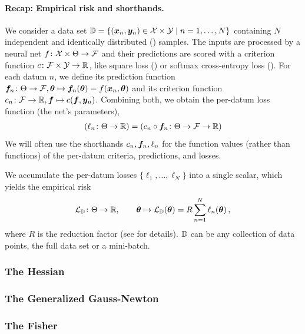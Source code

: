 \paragraph{Recap: Empirical risk and shorthands.}
We consider a data set ${\mathbb{D}} = \{({\bm{x}}_n, {\bm{y}}_n) \in {\mathcal{X}} \times {\mathcal{Y}} \mid n = 1, \dots, N \}$ containing $N$ independent and identically distributed (\iid) samples.
The inputs are processed by a neural net $f\colon {\mathcal{X}} \times \Theta \to {\mathcal{F}}$ and their predictions are scored with a criterion function $c\colon {\mathcal{F}} \times {\mathcal{Y}} \to {\mathbb{R}}$, like square loss () or softmax cross-entropy loss ().
For each datum $n$, we define its prediction function ${\bm{f}}_n\colon \Theta \to {\mathcal{F}}, {\bm{\theta}} \mapsto {\bm{f}}_n({\bm{\theta}}) = f({\bm{x}}_n, {\bm{\theta}})$ and its criterion function $c_n\colon {\mathcal{F}} \to {\mathbb{R}}, {\bm{f}} \mapsto c({\bm{f}}, {\bm{y}}_n)$.
Combining both, we obtain the per-datum loss function (\wrt the net's parameters),
\begin{align*}
  (\ell_n\colon \Theta \to {\mathbb{R}}) = (c_n \circ {\bm{f}}_n\colon \Theta \to {\mathcal{F}} \to {\mathbb{R}})
\end{align*}
We will often use the shorthands $c_n, {\bm{f}}_n, \ell_n$ for the function values (rather than functions) of the per-datum criteria, predictions, and losses.

We accumulate the per-datum losses $\{\ell_1, \dots, \ell_N\}$ into a single scalar, which yields the empirical risk
\begin{align*}
  {\mathcal{L}}_{{\mathbb{D}}}\colon \Theta \to {\mathbb{R}},
  \qquad
  {\bm{\theta}} \mapsto {\mathcal{L}}_{{\mathbb{D}}}({\bm{\theta}}) = R \sum_{n=1}^N \ell_n({\bm{\theta}})\,,
\end{align*}
where $R$ is the reduction factor (see  for details).
${\mathbb{D}}$ can be any collection of data points, \eg the full data set or a mini-batch.

\subsubsection{The Hessian}\label{sec:basics_dl_hessian}


\subsubsection{The Generalized Gauss-Newton}\label{subsec:curvature-ggn}


\subsubsection{The Fisher}\label{sec:fisher}


